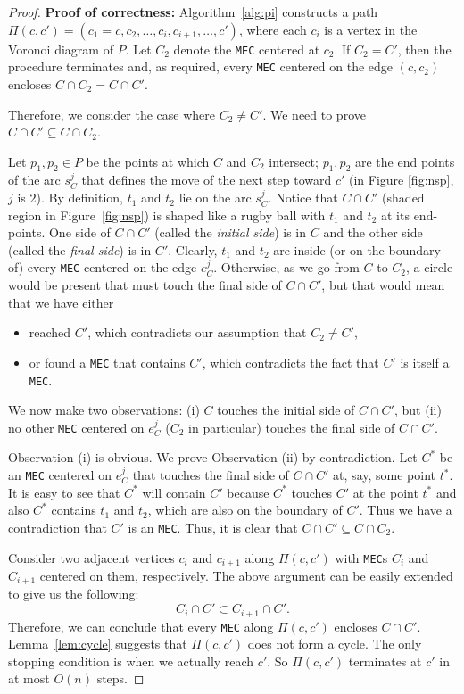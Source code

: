 \documentclass[12pt]{llncs}
\begin{document}
\begin{proof}
{\bf Proof of correctness:} 
Algorithm\ \ref{alg:pi} constructs a path $\Pi(c,c') = (c_1=c, c_2, \ldots,
c_i, c_{i+1}, \ldots, c')$, where each $c_i$ is a vertex in the Voronoi diagram of $P$. Let $C_2$ denote the
{\tt MEC} centered at $c_2$. If $C_2=C'$, then the procedure
terminates and, as required, every {\tt MEC} centered on the edge $(c,c_2)$ 
encloses $C \cap C_2 = C \cap C'$.  

Therefore, we consider the case where $C_2 \neq C'$. We need to prove 
$C \cap C' \subseteq C \cap C_2$.

Let $p_1, p_2 \in P$ be the points at which $C$ and $C_2$ intersect; $p_1,p_2$ are
the end points of the arc $s^j_C$ that defines the move of the next step 
toward $c'$ (in Figure \ref{fig:nsp}, $j$ is $2$). By
definition, $t_1$ and $t_2$ lie on the arc $s^j_C$. Notice that $C
\cap C'$ (shaded region in Figure~\ref{fig:nsp}) is shaped like a rugby
ball with $t_1$ and $t_2$ at its end-points. One side of $C \cap C'$
(called the {\it initial side}) is in $C$ and the other side 
(called the {\it final side}) is in $C'$. Clearly, $t_1$ and
$t_2$ are inside (or on the boundary of) every {\tt MEC} centered on the
edge $e^j_C$. Otherwise, as we go from $C$ to $C_2$, a
circle would be present that must touch the final side of $C \cap C'$, but that would 
mean
that we have either 
\begin{itemize}
\item reached $C'$, which contradicts our assumption that $C_2 \neq C'$, 
\item or found a {\tt MEC} that contains $C'$, which contradicts the fact
that $C'$ is itself a {\tt MEC}.
\end{itemize}


We now make two observations: (i) $C$ touches the initial side of $C
\cap C'$, but (ii) no other {\tt MEC} centered on $e^j_C$ ($C_2$ in particular)
touches the final side of $C \cap C'$. 

Observation (i) is obvious. We prove Observation (ii) by contradiction. Let  $C^*$ be an {\tt MEC} centered on $e^j_C$ that touches the final side
of $C \cap C'$ at, say, some point $t^*$. It is easy to see that $C^*$
will contain $C'$ because $C^*$ touches $C'$ at the point $t^*$ and also $C^*$ 
contains 
$t_1$
and $t_2$, which are also on the boundary of $C'$. Thus we have a contradiction that 
$C'$ 
is an {\tt MEC}. 
Thus, it is clear that $C \cap C' \subseteq C \cap C_2$.  

Consider two adjacent vertices $c_i$ and $c_{i+1}$ along $\Pi(c,c')$
with {\tt MEC}s $C_i$ and $C_{i+1}$ centered on them, respectively. The
above argument can be easily extended to give us the following: 
$$C_i \cap C' \subset C_{i+1} \cap C'.$$ Therefore, we can conclude
that every {\tt MEC} along $\Pi(c,c')$ encloses $C \cap C'$. 
Lemma~\ref{lem:cycle} suggests that $\Pi(c,c')$ does not
form a cycle. The only stopping condition is when we actually reach
$c'$. So $\Pi(c,c')$ terminates at $c'$ in at most $O(n)$ steps. 


\end{proof}
\end{document}
